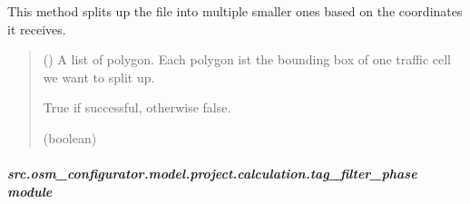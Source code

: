 \documentclass[letterpaper,10pt,english]{sphinxmanual}
\begin{document}
\begin{fulllineitems}
\begin{fulllineitems}
\label{\detokenize{apidoc/src.osm_configurator.model.project.calculation:src.osm_configurator.model.project.calculation.split_up_files.SplitUpFile.split_up_files}}
\pysigstartsignatures
{}
\pysigstopsignatures
\sphinxAtStartPar
This method splits up the file into multiple smaller ones based on the coordinates it receives.
\begin{quote}\begin{description}
\sphinxAtStartPar
{} (\sphinxstyleliteralemphasis{\sphinxupquote{{[}}}\sphinxstyleliteralemphasis{\sphinxupquote{{]}}}) \textendash{} A list of polygon. Each polygon ist the bounding box of one traffic cell we want to split up.

\sphinxAtStartPar
True if successful, otherwise false.

\sphinxAtStartPar
(boolean)

\end{description}\end{quote}

\end{fulllineitems}


\end{fulllineitems}



\subparagraph{src.osm\_configurator.model.project.calculation.tag\_filter\_phase module}
\label{\detokenize{apidoc/src.osm_configurator.model.project.calculation:module-src.osm_configurator.model.project.calculation.tag_filter_phase}}\label{\detokenize{apidoc/src.osm_configurator.model.project.calculation:src-osm-configurator-model-project-calculation-tag-filter-phase-module}}
\end{document}
